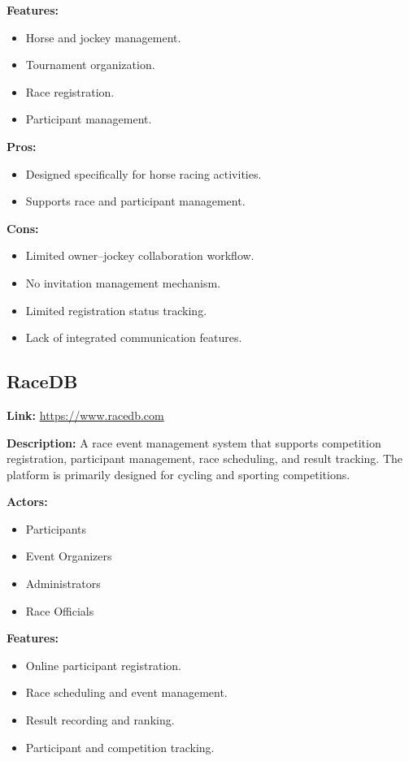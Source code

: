 \textbf{Features:}
\begin{itemize}
    \item Horse and jockey management.
    \item Tournament organization.
    \item Race registration.
    \item Participant management.
\end{itemize}

\textbf{Pros:}
\begin{itemize}
    \item Designed specifically for horse racing activities.
    \item Supports race and participant management.
\end{itemize}

\textbf{Cons:}
\begin{itemize}
    \item Limited owner--jockey collaboration workflow.
    \item No invitation management mechanism.
    \item Limited registration status tracking.
    \item Lack of integrated communication features.
\end{itemize}

\subsection{RaceDB}

\textbf{Link:} \url{https://www.racedb.com}

\textbf{Description:} A race event management system that supports competition registration, participant management, race scheduling, and result tracking. The platform is primarily designed for cycling and sporting competitions.

\textbf{Actors:}
\begin{itemize}
    \item Participants
    \item Event Organizers
    \item Administrators
    \item Race Officials
\end{itemize}

\textbf{Features:}
\begin{itemize}
    \item Online participant registration.
    \item Race scheduling and event management.
    \item Result recording and ranking.
    \item Participant and competition tracking.
\end{itemize}

